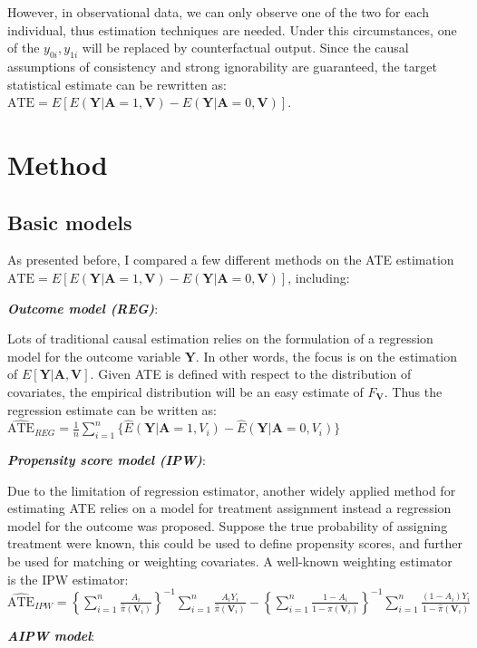 \documentclass[11pt, oneside]{article}
\newcommand{\bA}{\mathbf{A}}
\newcommand{\bY}{\mathbf{Y}}
\newcommand{\bV}{\mathbf{V}}
\begin{document}
However, in observational data, we can only observe one of the two for each individual, thus estimation techniques are needed. Under this circumstances, one of the $y_{0i},y_{1i}$ will be replaced by counterfactual output. Since the causal assumptions of consistency and strong ignorability are guaranteed, the target statistical estimate can be rewritten as: $\mbox{ATE}=E[E(\bY | \bA = 1, \bV) - E(\bY | \bA = 0, \bV)]$.
\section{Method}\label{sec:method}
\subsection{Basic models}
As presented before, I compared a few different methods on the ATE estimation$\mbox{ATE}=E[E(\bY | \bA = 1, \bV) - E(\bY | \bA = 0, \bV)]$, including:

\noindent
\textit{\textbf{Outcome model (REG)}}:

Lots of traditional causal estimation relies on the formulation of a regression model for the outcome variable $\bY$. In other words, the focus is on the estimation of $E[\bY|\bA,\bV]$. Given ATE is defined with respect to the distribution of covariates, the empirical distribution will be an easy estimate of $F_{\bV}$. Thus the regression estimate can be written as:
$
\widehat{\mbox{ATE}}_{REG}=\frac{1}{n}\sum_{i=1}^n \{\hat{E}(\bY | \bA = 1, V_i) - \hat{E}(\bY | \bA = 0, V_i)\}
$

\noindent
\textit{\textbf{Propensity score model (IPW)}}:

Due to the limitation of regression estimator, another widely applied method for estimating ATE relies on a model for treatment
assignment instead a regression model for the outcome was proposed. Suppose the true probability of assigning treatment were known, this could be used to define propensity scores, and further be used for matching or weighting covariates. A well-known weighting estimator is the IPW estimator:
$\widehat{\mbox{ATE}}_{IPW} =\left\{\sum_{i=1}^n \frac{A_i}{\hat{\pi}(\bV_i)}\right\}^{-1}\sum_{i=1}^n \frac{A_iY_i}{\hat{\pi}(\bV_i)} -\left\{\sum_{i=1}^n \frac{1-A_i}{1-\hat{\pi}(\bV_i)}\right\}^{-1}\sum_{i=1}^n\frac{(1-A_i)Y_i}{1-\hat{\pi}(\bV_i)}
$

\noindent
\textit{\textbf{AIPW model}}:
\end{document}
